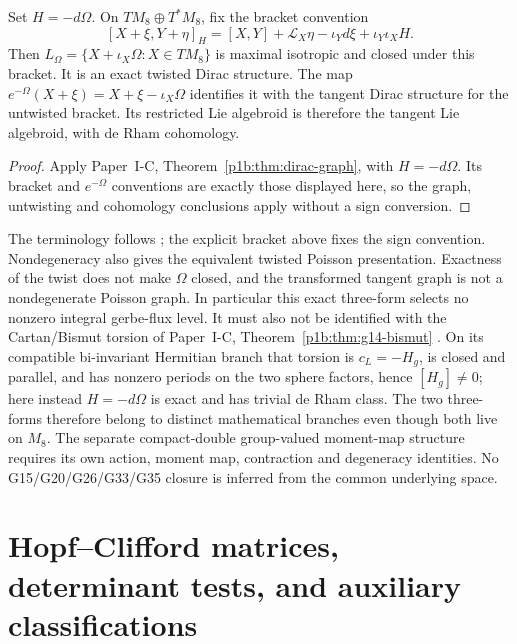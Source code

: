 \documentclass[11pt,a4paper]{article}
\begin{document}
\begin{theorem}
\label{p3b:thm:v203-exact-twisted-dirac}
Set $H=-d\Omega$. On $TM_8\oplus T^*M_8$, fix the bracket convention
\[
 [X+\xi,Y+\eta]_H=[X,Y]+\mathcal L_X\eta-\iota_Yd\xi
                                     +\iota_Y\iota_XH.
\]
Then $L_\Omega=\{X+\iota_X\Omega:X\in TM_8\}$ is maximal isotropic
and closed under this bracket. It is an exact twisted Dirac structure.
The map $e^{-\Omega}(X+\xi)=X+\xi-\iota_X\Omega$ identifies it with
the tangent Dirac structure for the untwisted bracket. Its restricted Lie
algebroid is therefore the tangent Lie algebroid, with de Rham cohomology.
\end{theorem}
\begin{proof}
Apply Paper~I-C, Theorem~\ref{p1b:thm:dirac-graph}, with
\(H=-d\Omega\).  Its bracket and \(e^{-\Omega}\) conventions are
exactly those displayed here, so the graph, untwisting and cohomology
conclusions apply without a sign conversion.
\end{proof}
The terminology follows \cite{SeveraWeinstein2001TwistedPoisson}; the
explicit bracket above fixes the sign convention. Nondegeneracy also gives
the equivalent twisted Poisson presentation. Exactness of the twist does
not make $\Omega$ closed, and the transformed tangent graph is not a
nondegenerate Poisson graph. In particular this exact three-form selects
no nonzero integral gerbe-flux level.  It must also not be identified with
the Cartan/Bismut torsion of Paper~I-C, Theorem~\ref{p1b:thm:g14-bismut}
\cite{Kugelmann2026Paper1C}.  On its compatible bi-invariant Hermitian branch
that torsion is \(c_L=-H_g\), is closed and parallel, and has nonzero periods
on the two sphere factors, hence \([H_g]\ne0\); here instead
\(H=-d\Omega\) is exact and has trivial de Rham class.  The two three-forms
therefore belong to distinct mathematical branches even though both live on
\(M_8\).  The separate compact-double group-valued moment-map structure
requires its own action, moment map, contraction and degeneracy identities.
No G15/G20/G26/G33/G35 closure is inferred from the common underlying space.


\section{Hopf--Clifford matrices, determinant tests, and auxiliary classifications}
\label{p3g:sec:hierarchy}
\end{document}
